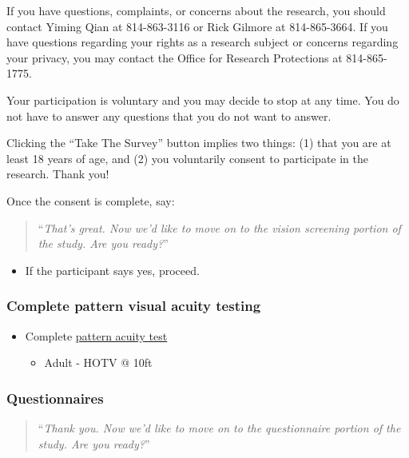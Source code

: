 \documentclass[]{article}
\providecommand{\tightlist}{%
  \setlength{\itemsep}{0pt}\setlength{\parskip}{0pt}}
\begin{document}
If you have questions, complaints, or concerns about the research, you
should contact Yiming Qian at 814-863-3116 or Rick Gilmore at
814-865-3664. If you have questions regarding your rights as a research
subject or concerns regarding your privacy, you may contact the Office
for Research Protections at 814-865-1775.

Your participation is voluntary and you may decide to stop at any time.
You do not have to answer any questions that you do not want to answer.

Clicking the ``Take The Survey'' button implies two things: (1) that you
are at least 18 years of age, and (2) you voluntarily consent to
participate in the research. Thank you!

Once the consent is complete, say:

\begin{quote}
``\emph{That's great. Now we'd like to move on to the vision screening
portion of the study. Are you ready?}''
\end{quote}

\begin{itemize}
\tightlist
\item
  If the participant says yes, proceed.
\end{itemize}

\hypertarget{complete-pattern-visual-acuity-testing}{%
\subsubsection{Complete pattern visual acuity
testing}\label{complete-pattern-visual-acuity-testing}}

\begin{itemize}
\tightlist
\item
  Complete \href{vision-screening-protocol.html}{pattern acuity test}

  \begin{itemize}
  \tightlist
  \item
    Adult - HOTV @ 10ft
  \end{itemize}
\end{itemize}

\hypertarget{questionnaires}{%
\subsubsection{Questionnaires}\label{questionnaires}}

\begin{quote}
``\emph{Thank you. Now we'd like to move on to the questionnaire portion
of the study. Are you ready?}''
\end{quote}
\end{document}
